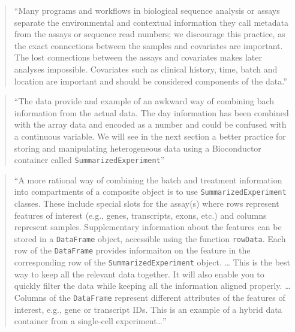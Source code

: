 \documentclass[]{tufte-book}
\begin{document}
\begin{quote}
``Many programs and workflows in biological sequence analysis or assays
separate the environmental and contextual information they call metadata
from the assays or sequence read numbers; we discourage this practice, as the
exact connections between the samples and covariates are important. The lost
connections between the assays and covariates makes later analyses impossible.
Covariates such as clinical history, time, batch and location are important
and should be considered components of the data.'' \citep{holmes2018modern}
\end{quote}

\begin{quote}
``The data provide and example of an awkward way of combining bach information
from the actual data. The day information has been combined with the array
data and encoded as a number and could be confused with a continuous variable.
We will see in the next section a better practice for storing and manipulating
heterogeneous data using a Bioconductor container called \texttt{SummarizedExperiment}''
\citep{holmes2018modern}
\end{quote}

\begin{quote}
``A more rational way of combining the batch and treatment information into
compartments of a composite object is to use \texttt{SummarizedExperiment} classes.
These include special slots for the assay(s) where rows represent features
of interest (e.g., genes, transcripts, exons, etc.) and columns represent samples.
Supplementary information about the features can be stored in a \texttt{DataFrame}
object, accessible using the function \texttt{rowData}. Each row of the \texttt{DataFrame}
provides informaiton on the feature in the corresponding row of the
\texttt{SummarizedExperiment} object. \ldots{} This is the best way to keep all the
relevant data together. It will also enable you to quickly filter the
data while keeping all the information aligned properly. \ldots{}
Columns of the \texttt{DataFrame} represent different attributes of the features
of interest, e.g., gene or transcript IDs. This is an example of a hybrid
data container from a single-cell experiment\ldots{}'' \citep{holmes2018modern}
\end{quote}
\end{document}
